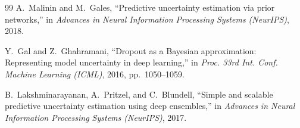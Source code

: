 \documentclass[conference]{IEEEtran}
\begin{document}
\begin{thebibliography}{99}
A.~Malinin and M.~Gales, ``Predictive uncertainty estimation via prior networks,'' in \emph{Advances in Neural Information Processing Systems (NeurIPS)}, 2018.

Y.~Gal and Z.~Ghahramani, ``Dropout as a Bayesian approximation: Representing model uncertainty in deep learning,'' in \emph{Proc. 33rd Int. Conf. Machine Learning (ICML)}, 2016, pp.~1050--1059.

B.~Lakshminarayanan, A.~Pritzel, and C.~Blundell, ``Simple and scalable predictive uncertainty estimation using deep ensembles,'' in \emph{Advances in Neural Information Processing Systems (NeurIPS)}, 2017.

\end{thebibliography}
\end{document}
